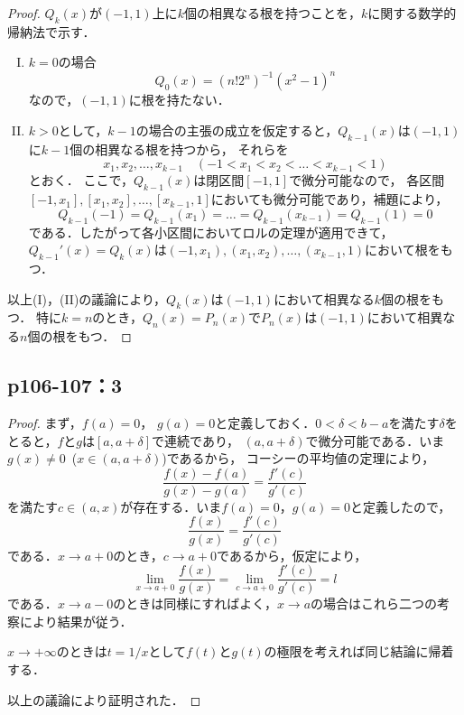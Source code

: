 \documentclass[a4paper,10pt,fleqn]{ltjsarticle}
\begin{document}
\begin{leftbar}
    \begin{proof}
        $Q_k (x)$が$(-1,1)$上に$k$個の相異なる根を持つことを，$k$に関する数学的帰納法で示す．
        \begin{enumerate}[(I)]
        \item $k=0$の場合
        \[
            Q_0(x)= (n! 2^n)^{-1} (x^2-1)^n
        \]
        なので，$(-1,1)$に根を持たない．
        \item $k>0$として，$k-1$の場合の主張の成立を仮定すると，$Q_{k-1}(x)$は$(-1,1)$に$k-1$個の相異なる根を持つから，
        それらを
        \[
        x_1,x_2,\dots,x_{k-1}\quad (-1<x_1<x_2<\dots <x_{k-1}<1)
        \]とおく．
        ここで，$Q_{k-1} (x)$は閉区間$[-1,1]$で微分可能なので，
        各区間$[-1,x_1],[x_1,x_2],\dots,[x_{k-1},1]$においても微分可能であり，補題により，
        \[
            Q_{k-1} (-1) = Q_{k-1}(x_1)=\dots = Q_{k-1}(x_{k-1})=Q_{k-1}(1)=0
        \]
        である．したがって各小区間においてロルの定理が適用できて，$Q_{k-1}' (x)=Q_k(x)$は$(-1,x_1),(x_1,x_2),\dots,(x_{k-1},1)$において根をもつ．
        \end{enumerate}
        以上(I)，(II)の議論により，$Q_k (x)$は$(-1,1)$において相異なる$k$個の根をもつ．
        特に$k=n$のとき，$Q_n (x)=P_n(x)$で$P_n (x)$は$(-1,1)$において相異なる$n$個の根をもつ．
    \end{proof}
\end{leftbar}

\newpage 

\subsection*{p106-107：3}

\begin{tleftbar}
  \begin{proof}
  まず，$f(a)=0$， $g(a)=0$と定義しておく．$0<\delta <b-a$を満たす$\delta$をとると，$f$と$g$は$[a,a+\delta]$で連続であり，
  $(a,a+\delta)$で微分可能である．いま$g(x) \ne 0$~($ x \in (a,a+\delta)$)であるから，
  コーシーの平均値の定理により，
  \[
    \frac{f(x)-f(a)}{g(x)-g(a)} = \frac{f'(c)}{g'(c)}
  \]
  を満たす$c \in (a,x)$が存在する．いま$f(a)=0$，$g(a)=0$と定義したので，
  \[
    \frac{f(x)}{g(x)} = \frac{f'(c)}{g'(c)}
  \]
  である．$ x \to a+0$のとき，$c \to a+0$であるから，仮定により，
  \[
    \lim_{x \to a+0} \frac{f(x)}{g(x)} = \lim_{c \to a+0} \frac{f'(c)}{g'(c)} =l 
  \]
  である．$ x \to a-0$のときは同様にすればよく，$ x \to a$の場合はこれら二つの考察により結果が従う．

  $ x \to +\infty$のときは$ t=1/x$として$f(t)$と$g(t)$の極限を考えれば同じ結論に帰着する．

  以上の議論により証明された．
  \end{proof}
\end{tleftbar}
\end{document}
